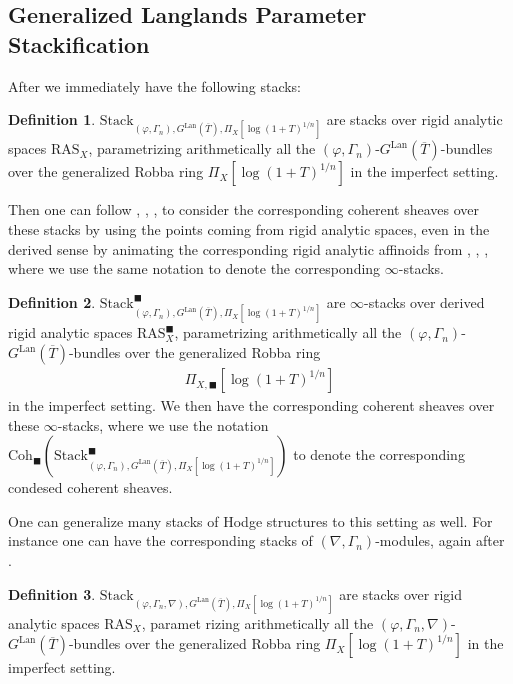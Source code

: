 \documentclass[12pt]{article}
\theoremstyle{definition}
\newtheorem{definition}{Definition}
\begin{document}
\subsection{Generalized Langlands Parameter Stackification}

\indent After \cite{EGH} we immediately have the following stacks:

\begin{definition}
$\mathrm{Stack}_{(\varphi,\Gamma_n), G^\mathrm{Lan}(\overline{T}),\Pi_X[\log(1+T)^{1/n}]}$ are stacks over rigid analytic spaces $\mathrm{RAS}_X$, parametrizing arithmetically all the $(\varphi,\Gamma_n)$-$G^\mathrm{Lan}(\overline{T})$-bundles over the generalized Robba ring $\Pi_X[\log(1+T)^{1/n}]$ in the imperfect setting.
\end{definition}

\indent Then one can follow \cite{FS}, \cite{DHKM}, \cite{EGH}, \cite{Z} to consider the corresponding coherent sheaves over these stacks by using the points coming from rigid analytic spaces, even in the derived sense by animating the corresponding rigid analytic affinoids from \cite{CSA}, \cite{CSB}, \cite{CSC}, where we use the same notation to denote the corresponding $\infty$-stacks.

\begin{definition}
$\mathrm{Stack}^\blacksquare_{(\varphi,\Gamma_n), G^\mathrm{Lan}(\overline{T}),\Pi_X[\log(1+T)^{1/n}]}$ are $\infty$-stacks over derived rigid analytic spaces $\mathrm{RAS}^\blacksquare_X$, parametrizing arithmetically all the $(\varphi,\Gamma_n)$-$G^\mathrm{Lan}(\overline{T})$-bundles over the generalized Robba ring 
\begin{align}
\Pi_{X,\blacksquare}[\log(1+T)^{1/n}]
\end{align}
in the imperfect setting. We then have the corresponding coherent sheaves over these $\infty$-stacks, where we use the notation $\mathrm{Coh}_\blacksquare(\mathrm{Stack}^\blacksquare_{(\varphi,\Gamma_n), G^\mathrm{Lan}(\overline{T}),\Pi_X[\log(1+T)^{1/n}]})$ to denote the corresponding condesed coherent sheaves.
\end{definition}

One can generalize many stacks of Hodge structures to this setting as well. For instance one can have the corresponding stacks of $(\nabla,\Gamma_n)$-modules, again after \cite{EGH}. 

\begin{definition}
$\mathrm{Stack}_{(\varphi,\Gamma_n,\nabla), G^\mathrm{Lan}(\overline{T}),\Pi_X[\log(1+T)^{1/n}]}$ are stacks over rigid analytic spaces $\mathrm{RAS}_X$, paramet
rizing arithmetically all the $(\varphi,\Gamma_n,\nabla)$-$G^\mathrm{Lan}(\overline{T})$-bundles over the generalized Robba ring $\Pi_X[\log(1+T)^{1/n}]$ in the imperfect setting.
\end{definition}
\end{document}
